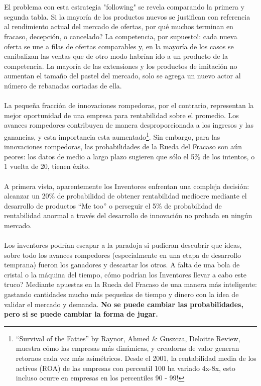 \documentclass{article}
\begin{document}
\\ \\
El problema con esta estrategia "following" se revela comparando la primera y segunda tabla. Si la mayor\'ia de los productos nuevos se justifican con referencia al rendimiento actual del mercado de ofertas, por qu\'e muchos terminan en fracaso, decepci\'on, o cancelado? La competencia, por supuesto!: cada nueva oferta se une a filas de ofertas comparables y, en la mayor\'ia de los casos se canibalizan las ventas que de otro modo habr\'ian ido a un producto de la competencia. La mayor\'ia de las extensiones y los productos de imitaci\'on no aumentan el tama\~no del pastel del mercado, solo se agrega un nuevo actor al n\'umero de rebanadas cortadas de ella.
\\ \\
La peque\~na fracci\'on de innovaciones rompedoras, por el contrario, representan la mejor oportunidad de una empresa para rentabilidad sobre el promedio. Los avances rompedores contribuyen de manera desproporcionada a los ingresos y las ganancias, y esta importancia esta aumentado\footnote{``Survival of the Fattes'' by Raynor, Ahmed \& Guszcza, Deloitte Review, muestra c\'omo las empresas m\'as din\'amicas, y creadoras de valor generan retornos cada vez m\'as asim\'etricos. Desde el 2001, la rentabilidad media de los activos (ROA) de las empresas con percentil 100 ha variado 4x-8x, esto incluso ocurre en empresas en los percentiles 90 - 99!}. Sin embargo, para las innovaciones rompedoras, las probabilidades de la Rueda del Fracaso son a\'un peores: los datos de medio a largo plazo sugieren que s\'olo el 5\% de los intentos, o 1 vuelta de 20, tienen \'exito.
\\ \\
A primera vista, aparentemente los Inventores enfrentan una compleja decisi\'on: alcanzar un 20\% de probabilidad de obtener rentabilidad mediocre mediante el desarrollo de productos ``Me too'' o perseguir el 5\% de probabilidad de rentabilidad anormal a trav\'es del desarrollo de innovaci\'on no probada en ning\'un mercado.
\\ \\
Los inventores podr\'ian escapar a la paradoja si pudieran descubrir que ideas, sobre todo los avances rompedores (especialmente en una etapa de desarrollo temprana) fueron los ganadores y descartar los otros. A falta de una bola de cristal o la m\'aquina del tiempo, c\'omo podr\'ian los Inventores llevar a cabo este truco? Mediante apuestas en la Rueda del Fracaso de una manera m\'as inteligente: gastando cantidades mucho m\'as peque\~nas de tiempo y dinero con la idea de validar el mercado y demanda. \textbf{No se puede cambiar las probabilidades, pero si se puede cambiar la forma de jugar.}
\end{document}
